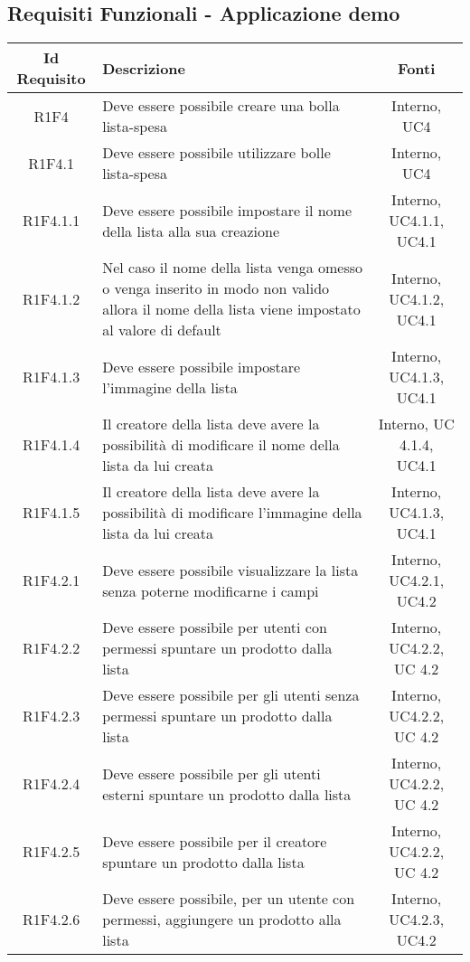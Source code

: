 \newpage
\subsection{Requisiti Funzionali - Applicazione demo}
\normalsize
\begingroup
\renewcommand\arraystretch{2}
\begin{longtable}{|c|>{\centering}m{7cm}|c|}
\hline
\textbf{Id Requisito} & \textbf{Descrizione} & \textbf{Fonti}\\
\hline
\endhead
			R1F4 & Deve essere possibile creare una bolla lista-spesa  & Interno, UC4 \\
			\hline
			R1F4.1 & Deve essere possibile utilizzare bolle lista-spesa  & Interno, UC4 \\
			\hline
			R1F4.1.1 & Deve essere possibile impostare il nome della lista alla sua creazione & Interno, UC4.1.1, UC4.1 \\
			\hline
			R1F4.1.2 & Nel caso il nome della lista venga omesso o venga inserito in modo non valido allora il nome della lista viene impostato al valore di default & Interno, UC4.1.2, UC4.1 \\
			\hline
			R1F4.1.3 & Deve essere possibile impostare l'immagine della lista & Interno, UC4.1.3, UC4.1 \\
			\hline
			R1F4.1.4 & Il creatore della lista deve avere la possibilità di modificare il nome della lista da lui creata & Interno, UC 4.1.4, UC4.1 \\
			\hline
			R1F4.1.5 & Il creatore della lista deve avere la possibilità di modificare l'immagine della lista da lui creata & Interno, UC4.1.3, UC4.1 \\
			\hline
			R1F4.2.1 & Deve essere possibile visualizzare la lista senza poterne modificarne i campi & Interno, UC4.2.1, UC4.2 \\
			\hline
			R1F4.2.2 & Deve essere possibile per utenti con permessi spuntare un prodotto dalla lista & Interno, UC4.2.2, UC 4.2 \\
			\hline
			R1F4.2.3 & Deve essere possibile per gli utenti senza permessi spuntare un prodotto dalla lista & Interno, UC4.2.2, UC 4.2 \\
			\hline
			R1F4.2.4 & Deve essere possibile per gli utenti esterni spuntare un prodotto dalla lista & Interno, UC4.2.2, UC 4.2 \\
			\hline
			R1F4.2.5 & Deve essere possibile per il creatore spuntare un prodotto dalla lista & Interno, UC4.2.2, UC 4.2 \\
			\hline
			R1F4.2.6 & Deve essere possibile, per un utente con permessi, aggiungere un prodotto alla lista & Interno, UC4.2.3, UC4.2 \\

\end{longtable}
